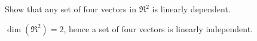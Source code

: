 
\begin{Exercise}[
name={},
title={}, 
difficulty=0,
origin={\cite{JH}}]
    Show that 
    any set of four vectors in \( \Re^2 \) is linearly dependent.
\end{Exercise}

\begin{Answer}
$\dim(\Re^2)=2$, hence a set of four vectors is linearly independent. 
\end{Answer}
